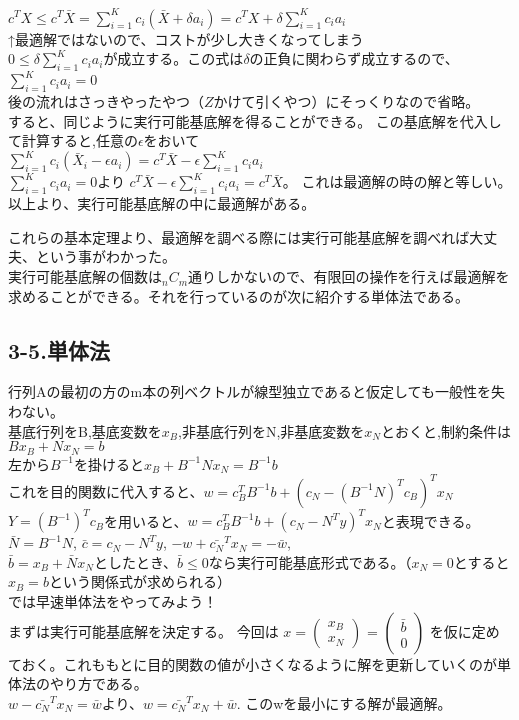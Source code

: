 \documentclass[platex,dvipdfmx]{jlreq}			%
\begin{document}
$c^{T} X \leq c^{T} \bar{X} = \sum\limits_{i=1}^K c_i (\bar{X} + \delta a_i ) = c^{T} X+ \delta \sum\limits_{i=1}^K c_i a_i $\\
↑最適解ではないので、コストが少し大きくなってしまう\\
$0 \leq \delta \sum\limits_{i=1}^K c_i a_i$が成立する。この式は$\delta$の正負に関わらず成立するので、$\sum\limits_{i=1}^K c_i a_i = 0$\\
後の流れはさっきやったやつ（$Z$かけて引くやつ）にそっくりなので省略。\\
すると、同じように実行可能基底解を得ることができる。
この基底解を代入して計算すると,任意の$\epsilon$をおいて\\
$\sum\limits_{i=1}^K c_i (\bar{X}_i - \epsilon a_i) = c^{T} \bar{X} - \epsilon \sum\limits_{i=1}^K c_i a_i$\\
$\sum\limits_{i=1}^K c_i a_i = 0$より
$c^{T} \bar{X} - \epsilon \sum\limits_{i=1}^K c_i a_i = c^{T} \bar{X}$。
これは最適解の時の解と等しい。\\
以上より、実行可能基底解の中に最適解がある。


これらの基本定理より、最適解を調べる際には実行可能基底解を調べれば大丈夫、という事がわかった。\\
実行可能基底解の個数は${}_n C_m$通りしかないので、有限回の操作を行えば最適解を求めることができる。それを行っているのが次に紹介する単体法である。




\subsection*{3-5.単体法}
行列Aの最初の方のm本の列ベクトルが線型独立であると仮定しても一般性を失わない。\\
基底行列をB,基底変数を$x_B$,非基底行列をN,非基底変数を$x_N$とおくと,制約条件は$B x_B + N x_N =b$\\
左から$B^{-1}$を掛けると$x_B + B^{-1} N x_N = B^{-1} b$\\
これを目的関数に代入すると、$w = c_B^{T} B^{-1}b + (c_N - (B^{-1} N)^{T} c_B)^{T} x_N$\\
$Y = (B^{-1})^{T} c_B$を用いると、$w = c_B^{T} B^{-1}b + (c_N - N^{T} y)^{T} x_N $と表現できる。\\
$\bar{N}= B^{-1} N $, \quad 
$\bar{c} = c_N - N^{T} y$, \quad
$-w + \bar{c_N}^{T} x_N = - \bar{w}$, \\
$\bar{b} = x_B + \bar{N} x_N$としたとき、$\bar{b} \leq 0$なら実行可能基底形式である。（$x_N=0$とすると$x_B = b$という関係式が求められる）\\
では早速単体法をやってみよう！\\
まずは実行可能基底解を決定する。
今回は
$x= \begin{pmatrix}
x_B\\
x_N
\end{pmatrix}
$
=
$\begin{pmatrix}
\bar{b}\\
0
\end{pmatrix}
$
を仮に定めておく。これももとに目的関数の値が小さくなるように解を更新していくのが単体法のやり方である。\\
$w - \bar{c_N}^{T} x_N =  \bar{w}$より、$w = \bar{c_N}^{T} x_N +  \bar{w}$. このwを最小にする解が最適解。
\end{document}
